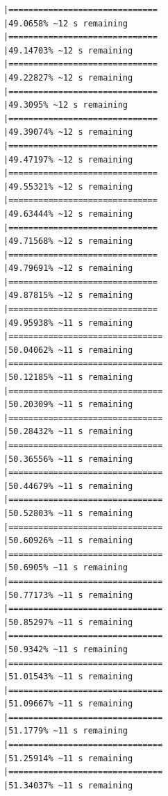 \documentclass{article}\usepackage[]{graphicx}\usepackage[]{xcolor}
\makeatletter
\newenvironment{kframe}{%
 \def\at@end@of@kframe{}%
 \ifinner\ifhmode%
  \def\at@end@of@kframe{\end{minipage}}%
  \begin{minipage}{\columnwidth}%
 \fi\fi%
 \def\FrameCommand##1{\hskip\@totalleftmargin \hskip-\fboxsep
 \colorbox{shadecolor}{##1}\hskip-\fboxsep
     \hskip-\linewidth \hskip-\@totalleftmargin \hskip\columnwidth}%
 \MakeFramed {\advance\hsize-\width
   \@totalleftmargin\z@ \linewidth\hsize
   \@setminipage}}%
 {\par\unskip\endMakeFramed%
 \at@end@of@kframe}
\newenvironment{knitrout}{}{} %
\makeatother
\begin{document}
\begin{knitrout}
\begin{kframe}
\begin{verbatim}
|==============================                                |49.0658% ~12 s remaining  
|==============================                                |49.14703% ~12 s remaining 
|==============================                                |49.22827% ~12 s remaining 
|==============================                                |49.3095% ~12 s remaining  
|==============================                                |49.39074% ~12 s remaining 
|==============================                                |49.47197% ~12 s remaining 
|==============================                                |49.55321% ~12 s remaining 
|==============================                                |49.63444% ~12 s remaining 
|==============================                                |49.71568% ~12 s remaining 
|==============================                                |49.79691% ~12 s remaining 
|==============================                                |49.87815% ~12 s remaining 
|==============================                                |49.95938% ~11 s remaining 
|===============================                               |50.04062% ~11 s remaining 
|===============================                               |50.12185% ~11 s remaining 
|===============================                               |50.20309% ~11 s remaining 
|===============================                               |50.28432% ~11 s remaining 
|===============================                               |50.36556% ~11 s remaining 
|===============================                               |50.44679% ~11 s remaining 
|===============================                               |50.52803% ~11 s remaining 
|===============================                               |50.60926% ~11 s remaining 
|===============================                               |50.6905% ~11 s remaining  
|===============================                               |50.77173% ~11 s remaining 
|===============================                               |50.85297% ~11 s remaining 
|===============================                               |50.9342% ~11 s remaining  
|===============================                               |51.01543% ~11 s remaining 
|===============================                               |51.09667% ~11 s remaining 
|===============================                               |51.1779% ~11 s remaining  
|===============================                               |51.25914% ~11 s remaining 
|===============================                               |51.34037% ~11 s remaining 

\end{verbatim}
\end{kframe}
\end{knitrout}
\end{document}
